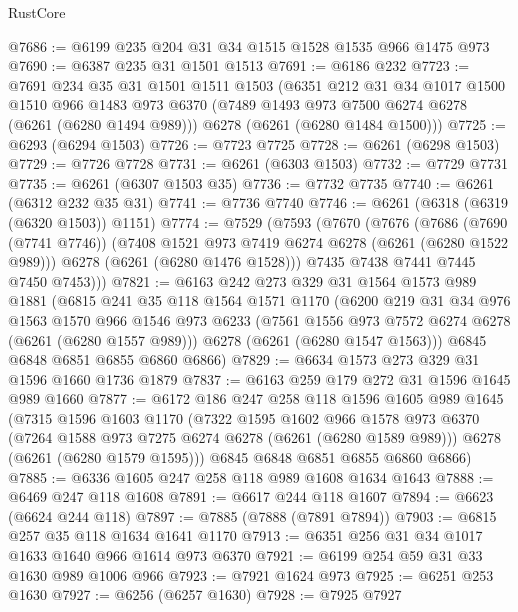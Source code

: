 \begin{lexlean}{RustCore}
\begin{coremodule}
@7686 := @6199 @235 @204 @31 @34 @1515 @1528 @1535 @966 @1475 @973
@7690 := @6387 @235 @31 @1501 @1513
@7691 := @6186 @232
@7723 := @7691
    @234
    @35
    @31
    @1501
    @1511
    @1503
    (@6351
      @212
      @31
      @34
      @1017
      @1500
      @1510
      @966
      @1483
      @973
      @6370
      (@7489 @1493 @973 @7500 @6274 @6278 (@6261 (@6280 @1494 @989)))
      @6278
      (@6261 (@6280 @1484 @1500)))
@7725 := @6293 (@6294 @1503)
@7726 := @7723 @7725
@7728 := @6261 (@6298 @1503)
@7729 := @7726 @7728
@7731 := @6261 (@6303 @1503)
@7732 := @7729 @7731
@7735 := @6261 (@6307 @1503 @35)
@7736 := @7732 @7735
@7740 := @6261 (@6312 @232 @35 @31)
@7741 := @7736 @7740
@7746 := @6261 (@6318 (@6319 (@6320 @1503)) @1151)
@7774 := @7529
    (@7593
      (@7670
        (@7676
          (@7686
            (@7690 (@7741 @7746))
            (@7408 @1521 @973 @7419 @6274 @6278 (@6261 (@6280 @1522 @989)))
            @6278
            (@6261 (@6280 @1476 @1528)))
          @7435
          @7438
          @7441
          @7445
          @7450
          @7453)))
@7821 := @6163
    @242
    @273
    @329
    @31
    @1564
    @1573
    @989
    @1881
    (@6815
      @241
      @35
      @118
      @1564
      @1571
      @1170
      (@6200
        @219
        @31
        @34
        @976
        @1563
        @1570
        @966
        @1546
        @973
        @6233
        (@7561 @1556 @973 @7572 @6274 @6278 (@6261 (@6280 @1557 @989)))
        @6278
        (@6261 (@6280 @1547 @1563)))
      @6845
      @6848
      @6851
      @6855
      @6860
      @6866)
@7829 := @6634 @1573 @273 @329 @31 @1596 @1660 @1736 @1879
@7837 := @6163 @259 @179 @272 @31 @1596 @1645 @989 @1660
@7877 := @6172
    @186
    @247
    @258
    @118
    @1596
    @1605
    @989
    @1645
    (@7315
      @1596
      @1603
      @1170
      (@7322
        @1595
        @1602
        @966
        @1578
        @973
        @6370
        (@7264 @1588 @973 @7275 @6274 @6278 (@6261 (@6280 @1589 @989)))
        @6278
        (@6261 (@6280 @1579 @1595)))
      @6845
      @6848
      @6851
      @6855
      @6860
      @6866)
@7885 := @6336 @1605 @247 @258 @118 @989 @1608 @1634 @1643
@7888 := @6469 @247 @118 @1608
@7891 := @6617 @244 @118 @1607
@7894 := @6623 (@6624 @244 @118)
@7897 := @7885 (@7888 (@7891 @7894))
@7903 := @6815 @257 @35 @118 @1634 @1641 @1170
@7913 := @6351 @256 @31 @34 @1017 @1633 @1640 @966 @1614 @973 @6370
@7921 := @6199 @254 @59 @31 @33 @1630 @989 @1006 @966
@7923 := @7921 @1624 @973
@7925 := @6251 @253 @1630
@7927 := @6256 (@6257 @1630)
@7928 := @7925 @7927

\end{coremodule}
\end{lexlean}
